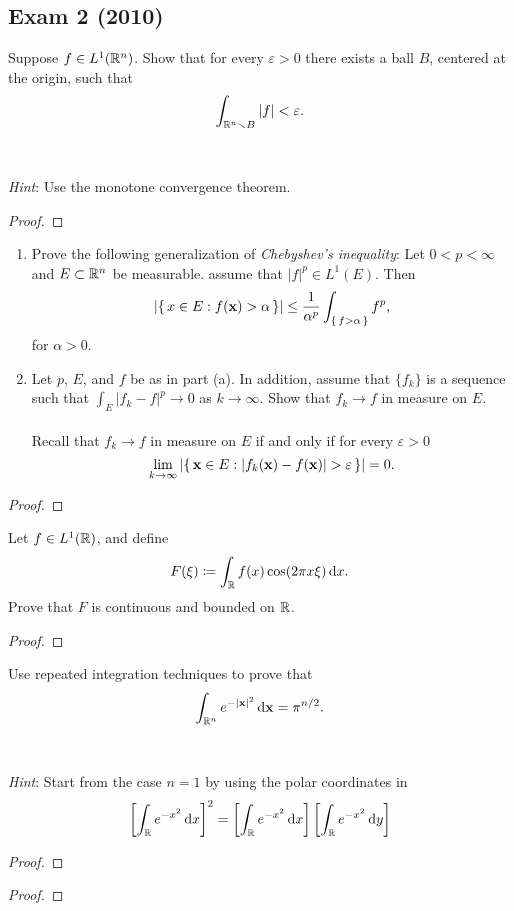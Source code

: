 \subsection{Exam 2 (2010)}
\begin{problem}
Suppose $f\in L^1(\mathbb{R}^n)$. Show that for every $\varepsilon>0$ there
exists a ball $B$, centered at the origin, such that
\[
\int_{\mathbb{R}^n\smallsetminus B}|f|<\varepsilon.
\]
\\\\
\emph{Hint}: Use the monotone convergence theorem.
\end{problem}
\begin{proof}
\end{proof}
\begin{problem}
\begin{enumerate}[label=(\alph*)]
\item Prove the following generalization of \emph{Chebyshev's inequality}:
  Let $0<p<\infty$ and $E\subset\mathbb{R}^n$ be measurable. assume that
  $|f|^p\in L^1(E)$. Then
\[
\left|\left\{\,x\in E:f(\mathbf{x})>\alpha\,\right\}\right|
\leq\frac{1}{\alpha^p}\int_{\left\{\,f>\alpha\,\right\}}f^p,
\]
for $\alpha>0$.
\item Let $p$, $E$, and $f$ be as in part (a). In addition, assume that
  $\{f_k\}$ is a sequence such that $\int_E|f_k-f|^p\to 0$ as
  $k\to\infty$. Show that $f_k\to f$ in measure on $E$.
\\\\
Recall that $f_k\to f$ in measure on $E$ if and only if for every
$\varepsilon>0$
\[
\lim_{k\to\infty}\left|\left\{\,\bfx\in
    E:|f_k(\bfx)-f(\bfx)|>\varepsilon\,\right\}\right|=0.
\]
\end{enumerate}
\end{problem}
\begin{proof}
\end{proof}

\begin{problem}
Let $f\in L^1(\mathbb{R})$, and define
\[
F(\xi)\coloneqq\int_{\mathbb{R}} f(x)\cos(2\pi x\xi)\mathop{}\!\mathrm{d} x.
\]
Prove that $F$ is continuous and bounded on $\mathbb{R}$.
\end{problem}
\begin{proof}
\end{proof}

\begin{problem}
Use repeated integration techniques to prove that
\[
\int_{\mathbb{R}^n} e^{-|\mathbf{x}|^2}\mathop{}\!\mathrm{d}\mathbf{x}=\pi^{n/2}.
\]
\\\\
\emph{Hint}: Start from the case $n=1$ by using the polar coordinates in
\[
\left[\int_{\mathbb{R}} e^{-x^2}\mathop{}\!\mathrm{d} x\right]^2=
\left[\int_{\mathbb{R}} e^{-x^2}\mathop{}\!\mathrm{d} x\right]
\left[\int_{\mathbb{R}} e^{-x^2}\mathop{}\!\mathrm{d} y\right]
\]
\end{problem}
\begin{proof}
\end{proof}

\begin{problem}
\end{problem}
\begin{proof}
\end{proof}

